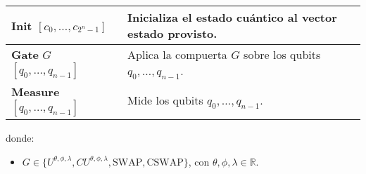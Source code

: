\begin{definicion}
\label{qiskit_def}
\leavevmode
\smallskip
\begin{center}
\begin{tabularx}{\textwidth}{l X}
    \hline
    \textbf{Init} $[c_0, \dots, c_{2^n-1}]$ &  Inicializa el estado cuántico al vector estado provisto.\vspace{3pt}\\
    \hline
    \textbf{Gate} $G$ $[q_0, \dots, q_{n-1}]$ &  Aplica la compuerta $G$ sobre los qubits $q_0, \dots, q_{n-1}$.\vspace{3pt}\\
    \hline 
    \textbf{Measure} $[q_0, \dots, q_{n-1}]$ & Mide los qubits $q_0, \dots, q_{n-1}$.\vspace{3pt}\\
    \hline
\end{tabularx}
\end{center}
donde:
\begin{itemize}
    \item $G \in \{U^{\theta, \phi, \lambda}, CU^{\theta, \phi, \lambda}, \textrm{SWAP}, \textrm{CSWAP}\}$, con $\theta, \phi, \lambda \in \mathbb{R}$.
\end{itemize}
\end{definicion}


